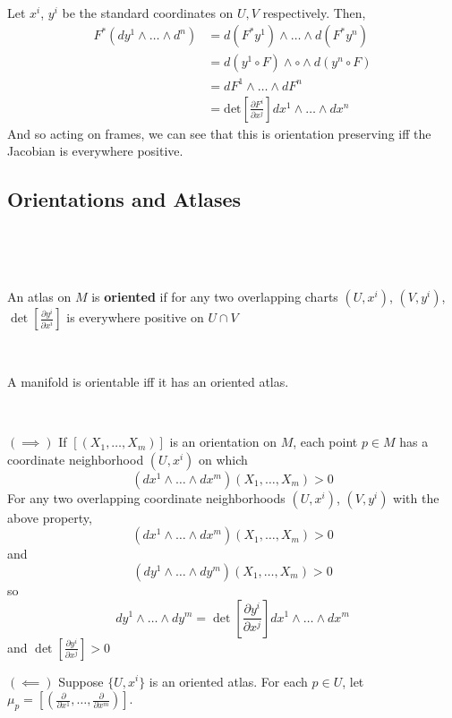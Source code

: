 \documentclass{article}
\begin{document}
\begin{customproof}
  \

  Let $x^i$, $y^i$ be the standard coordinates on $U, V$ respectively. Then,
  \begin{align*}
    F^*(dy^1 \wedge \dots \wedge d^n) &= d(F^*y^1) \wedge \dots \wedge d(F^*y^n)\\
    &= d(y^1 \circ F) \wedge \circ \wedge d(y^n \circ F)\\
    &= dF^1 \wedge \dots \wedge dF^n\\
    &= \text{det}[\frac{\partial F^i}{\partial x^j}] dx^1 \wedge \dots \wedge dx^n
  \end{align*}And so acting on frames, we can see that this is orientation preserving iff the Jacobian is everywhere positive.
\end{customproof}

\subsection{Orientations and Atlases}
\

\begin{definition}
  \

  An atlas on $M$ is \textbf{oriented} if for any two overlapping charts $(U, x^i)$, $(V, y^i)$, $\det [\frac{\partial y^i}{\partial x^i}]$ is everywhere positive on $U \cap V$
\end{definition}

\begin{theorem}
  \

  A manifold is orientable iff it has an oriented atlas.
\end{theorem}

\begin{customproof}
  \

  $(\implies)$ If $[(X_1, \dots, X_m)]$ is an orientation on $M$, each point $p \in M$ has a coordinate neighborhood $(U, x^i)$ on which $$(dx^1 \wedge \dots \wedge dx^m)(X_1, \dots, X_m) > 0$$For any two overlapping coordinate neighborhoods $(U, x^i)$, $(V, y^i)$ with the above property, $$(dx^1 \wedge \dots \wedge dx^m)(X_1, \dots, X_m) > 0$$ and $$(dy^1 \wedge \dots \wedge dy^m)(X_1, \dots, X_m) > 0$$ so $$dy^1 \wedge \dots \wedge dy^m = \det[\frac{\partial y^i}{\partial x^j}] dx^1 \wedge \dots \wedge dx^m$$and $\det[\frac{\partial y^i}{\partial x^j}] > 0$

  $(\impliedby)$ Suppose $\{U, x^i\}$ is an oriented atlas. For each $p \in U$, let $\mu_p = [(\frac{\partial}{\partial x^1}, \dots, \frac{\partial}{\partial x^m})]$.
\end{customproof}
\end{document}
